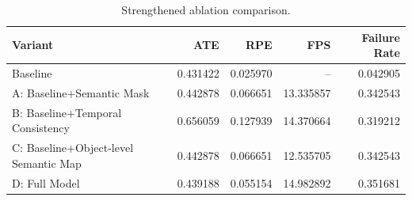 \begin{table}[t]
\centering
\caption{Strengthened ablation comparison.}
\label{tab:ablation_comparison}
\begin{tabular}{lrrrr}
\toprule
Variant & ATE & RPE & FPS & Failure Rate \\
\midrule
Baseline & 0.431422 & 0.025970 & -- & 0.042905 \\
A: Baseline+Semantic Mask & 0.442878 & 0.066651 & 13.335857 & 0.342543 \\
B: Baseline+Temporal Consistency & 0.656059 & 0.127939 & 14.370664 & 0.319212 \\
C: Baseline+Object-level Semantic Map & 0.442878 & 0.066651 & 12.535705 & 0.342543 \\
D: Full Model & 0.439188 & 0.055154 & 14.982892 & 0.351681 \\
\bottomrule
\end{tabular}
\end{table}
